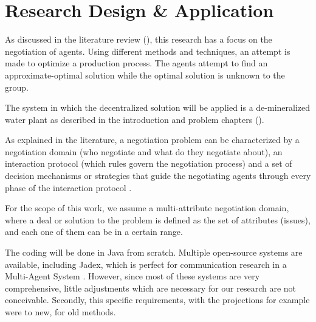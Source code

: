\chapter{Research Design \& Application}
\label{ch:design}
As discussed in the literature review (), this research has a focus on the negotiation of agents. Using different methods and techniques, an attempt is made to optimize a production process. The agents attempt to find an approximate-optimal solution while the optimal solution is unknown to the group. %

The system in which the  decentralized solution will be applied is a de-mineralized water plant as described in the introduction and problem chapters ().

As explained in the literature, a negotiation problem can be characterized by a negotiation domain (who negotiate and what do they negotiate about), an interaction protocol (which rules govern the negotiation process) and a set of decision mechanisms or strategies that guide the negotiating agents through every phase of the interaction protocol \citep{fatima2014principles}.

For the scope of this work, we assume a multi-attribute negotiation domain, where a deal or solution to the problem is defined as the set of attributes (issues), and each one of them can be in a certain range.

The coding will be done in Java from scratch. Multiple open-source systems are available, including Jadex, which is perfect for communication research in a Multi-Agent System \citep{kravari2015survey}. However, since most of these systems are very comprehensive, little adjustments which are necessary for our research are not conceivable. Secondly, this specific requirements, with the projections for example were to new, for old methods. 

